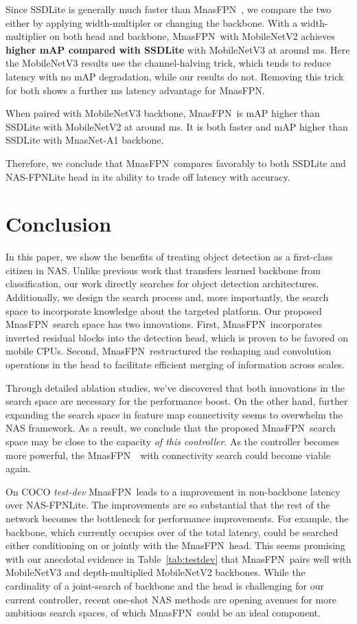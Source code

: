 \documentclass[10pt,twocolumn,letterpaper]{article}
\def\Mnasfpn{MnasFPN~}
\def\Mnasfpnnospace{MnasFPN}
\begin{document}
Since SSDLite is generally much faster than \Mnasfpn, we compare the two either by applying width-multipler or changing the backbone. With a  width-multiplier on both head and backbone, \Mnasfpn with MobileNetV2 achieves {\bf  higher mAP compared with SSDLite} with MobileNetV3 at around  ms. Here the MobileNetV3 results use the channel-halving trick, which tends to reduce latency with no mAP degradation, while our results do not. Removing this trick for both shows a further  ms latency advantage for \Mnasfpnnospace. 

When paired with MobileNetV3 backbone, \Mnasfpn is  mAP higher than SSDLite with MobileNetV2 at around  ms. It is both faster and  mAP higher than SSDLite with MnasNet-A1 backbone. 

Therefore, we conclude that \Mnasfpn compares favorably to both SSDLite and NAS-FPNLite head in its ability to trade off latency with accuracy.





 
\section{Conclusion}
In this paper, we show the benefits of treating object detection as a first-class citizen in NAS. Unlike previous work that transfers learned backbone from classification, our work directly searches for object detection architectures. Additionally, we design the search process and, more importantly, the search space to incorporate knowledge about the targeted platform. Our proposed \Mnasfpn search space has two innovations. First, \Mnasfpn incorporates inverted residual blocks into the detection head, which is proven to be favored on mobile CPUs. Second, \Mnasfpn restructured the reshaping and convolution operations in the head to facilitate efficient merging of information across scales. 

Through detailed ablation studies, we've discovered that both innovations in the search space are necessary for the performance boost. On the other hand, further expanding the search space in feature map connectivity seems to overwhelm the NAS framework. As a result, we conclude that the proposed \Mnasfpn search space may be close to the capacity {\it of this controller}. As the controller becomes more powerful, the \Mnasfpn~with connectivity search could become viable again. 

On COCO {\it test-dev} \Mnasfpn leads to a  improvement in non-backbone latency over NAS-FPNLite. The improvements are so substantial that the rest of the network becomes the bottleneck for performance improvements. For example, the backbone, which currently occupies over  of the total latency, could be searched either conditioning on or jointly with the \Mnasfpn head. This seems promising with our anecdotal evidence in Table~\ref{tab:testdev} that \Mnasfpn pairs well with MobileNetV3 and depth-multiplied MobileNetV2 backbones. While the cardinality of a joint-search of backbone and the head is challenging for our current controller, recent one-shot NAS methods are opening avenues for more ambitious search spaces, of which \Mnasfpn could be an ideal component.
\end{document}
